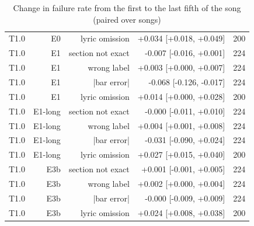 \begin{table}[t]
\begin{tabular}{lrrrr}
T1.0 & E0 & lyric omission & +0.034 [+0.018, +0.049] & 200 \\
T1.0 & E1 & section not exact & -0.007 [-0.016, +0.001] & 224 \\
T1.0 & E1 & wrong label & +0.003 [+0.000, +0.007] & 224 \\
T1.0 & E1 & |bar error| & -0.068 [-0.126, -0.017] & 224 \\
T1.0 & E1 & lyric omission & +0.014 [+0.000, +0.028] & 200 \\
T1.0 & E1-long & section not exact & -0.000 [-0.011, +0.010] & 224 \\
T1.0 & E1-long & wrong label & +0.004 [+0.001, +0.008] & 224 \\
T1.0 & E1-long & |bar error| & -0.031 [-0.090, +0.024] & 224 \\
T1.0 & E1-long & lyric omission & +0.027 [+0.015, +0.040] & 200 \\
T1.0 & E3b & section not exact & +0.001 [-0.001, +0.005] & 224 \\
T1.0 & E3b & wrong label & +0.002 [+0.000, +0.004] & 224 \\
T1.0 & E3b & |bar error| & -0.000 [-0.009, +0.009] & 224 \\
T1.0 & E3b & lyric omission & +0.024 [+0.008, +0.038] & 200 \\
\bottomrule
\end{tabular}
\caption{Change in failure rate from the first to the last fifth of the song (paired over songs)}
\label{tab:long_range_trend}
\end{table}
